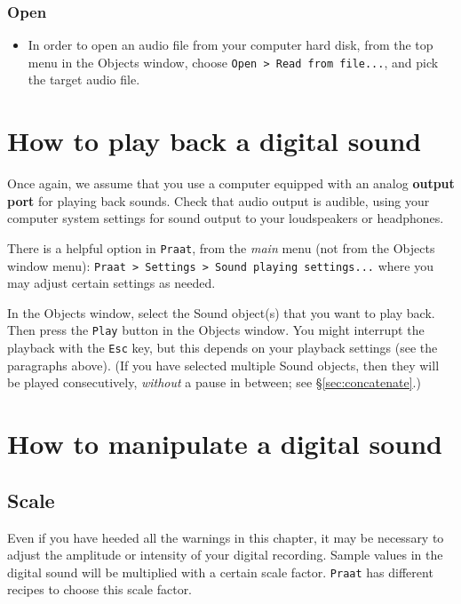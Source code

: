 \documentclass[
]{book}
\providecommand{\tightlist}{%
  \setlength{\itemsep}{0pt}\setlength{\parskip}{0pt}}
\begin{document}
\subsubsection{Open}\label{sec:praatopen}

\begin{itemize}
\tightlist
\item
  In order to open an audio file from your computer hard disk, from the top menu in the Objects window, choose \texttt{Open\ \textgreater{}\ Read\ from\ file...}, and pick the target audio file.
\end{itemize}

\section{How to play back a digital sound}\label{how-to-play-back-a-digital-sound}

Once again, we assume that you use a computer equipped with an analog \textbf{output port} for playing back sounds. Check that audio output is audible, using your computer system settings for sound output to your loudspeakers or headphones.

There is a helpful option in \texttt{Praat}, from the \emph{main} menu (not from the Objects window menu): \texttt{Praat\ \textgreater{}\ Settings\ \textgreater{}\ Sound\ playing\ settings...} where you may adjust certain settings as needed.

\label{box-praatplay}
In the Objects window, select the Sound object(s) that you want to play back. Then press the \texttt{Play} button in the Objects window. You might interrupt the playback with the \texttt{Esc} key, but this depends on your playback settings (see the paragraphs above). (If you have selected multiple Sound objects, then they will be played consecutively, \emph{without} a pause in between; see §\ref{sec:concatenate}.)

\section{How to manipulate a digital sound}\label{how-to-manipulate-a-digital-sound}

\subsection{Scale}\label{scale}

Even if you have heeded all the warnings in this chapter, it may be necessary to adjust the amplitude or intensity of your digital recording. Sample values in the digital sound will be multiplied with a certain scale factor. \texttt{Praat} has different recipes to choose this scale factor.
\end{document}
